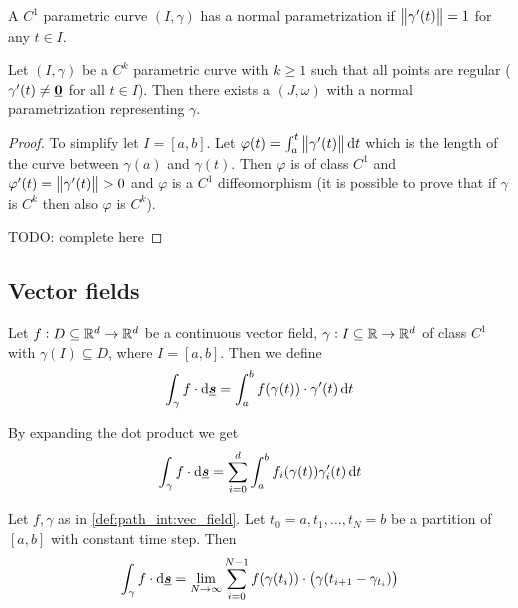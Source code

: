 \documentclass[12pt]{extarticle}
\renewcommand{\vec}[1]{\uvec{#1}}
\begin{document}
\begin{definition}
    A $C^1$ parametric curve $(I, \gamma)$ has a normal parametrization if $\norm{\gamma'(t)} = 1$ for any $t \in I$.
\end{definition}

\begin{proposition}
    Let $(I, \gamma)$ be a $C^k$ parametric curve with $k \geq 1$ such that all points are regular ($\gamma'(t) \neq \vec 0$ for all $t \in I$).
    Then there exists a $(J, \omega)$ with a normal parametrization representing $\gamma$.
\end{proposition}

\begin{proof}
    To simplify let $I = [a, b]$. Let $\varphi(t) = \int_a^t \norm{\gamma'(t)}\dd{t}$ which is the length of the curve between $\gamma(a)$ and $\gamma(t)$.
    Then $\varphi$ is of class $C^1$ and $\varphi'(t) = \norm{\gamma'(t)} > 0$ and $\varphi$ is a $C^1$ diffeomorphism (it is possible to prove that if $\gamma$ is $C^k$ then also $\varphi$ is $C^k$).

    TODO: complete here
\end{proof}

\subsection{Vector fields}

\begin{definition}
    \label{def:path_int:vec_field}
    Let $f: D \subseteq \mathbb{R}^d \to \mathbb{R}^d$ be a continuous vector field, $\gamma: I \subseteq \mathbb{R} \to \mathbb{R}^d$ of class $C^1$ with $\gamma(I) \subseteq D$, where $I = [a, b]$.
    Then we define
    \begin{equation}
        \int_\gamma f \cdot \dd{\vec{s}} = \int_a^b f(\gamma(t)) \cdot \gamma'(t) \dd{t}
    \end{equation}
\end{definition}

\begin{remark}
    By expanding the dot product we get
    \begin{equation}
        \int_\gamma f \cdot \dd{\vec{s}} = \sum_{i = 0}^d \int_a^b f_i(\gamma(t))\gamma_i'(t) \dd{t}
    \end{equation}
\end{remark}

\begin{proposition}
    Let $f, \gamma$ as in \autoref{def:path_int:vec_field}.
    Let $t_0 = a, t_1, \dots, t_N = b$ be a partition of $[a, b]$ with constant time step.
    Then
    \begin{equation}
        \int_\gamma f \cdot \dd{\vec s} = \lim_{N \to \infty} \sum_{i = 0}^{N -1} f(\gamma(t_i)) \cdot \left( \gamma(t_{i+1} - \gamma_{t_i}) \right)
    \end{equation}
\end{proposition}
\end{document}
